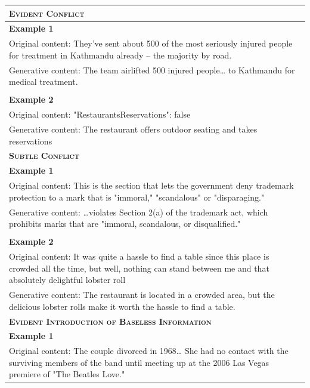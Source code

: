 \begin{table}[!ht]

\renewcommand{\arraystretch}{1.1}

\small
\centering
    \begin{tabular}{p{}}
    \toprule
    \textbf{\textsc{Evident Conflict}}\\
    \midrule
    \textbf{Example 1}\\
    Original content: They’ve sent about 500 of the most seriously injured people for treatment in Kathmandu already -- the majority by road.\\
    Generative content: The team airlifted 500 injured people… to Kathmandu for medical treatment. \\
    \\
    \textbf{Example 2}\\
    Original content: "RestaurantsReservations": false\\
    Generative content: The restaurant offers outdoor seating and takes reservations\\
    \midrule
    \textbf{\textsc{Subtle Conflict}}\\
    \midrule
    \textbf{Example 1}\\
    Original content: This is the section that lets the government deny trademark protection to a mark that is "immoral," "scandalous" or "disparaging."\\
    Generative content: …violates Section 2(a) of the trademark act, which prohibits marks that are "immoral, scandalous, or disqualified."\\
    \\
    \textbf{Example 2}\\
    Original content: It was quite a hassle to find a table since this place is crowded all the time, but well, nothing can stand between me and that absolutely delightful lobster roll\\
    Generative content: The restaurant is located in a crowded area, but the delicious lobster rolls make it worth the hassle to find a table.\\
    \midrule
    \textbf{\textsc{Evident Introduction of Baseless Information}} \\
    \midrule
    \textbf{Example 1}\\
    Original content: The couple divorced in 1968… She had no contact with the surviving members of the band until meeting up at the 2006 Las Vegas premiere of "The Beatles Love." \\

\end{tabular}
\end{table}
